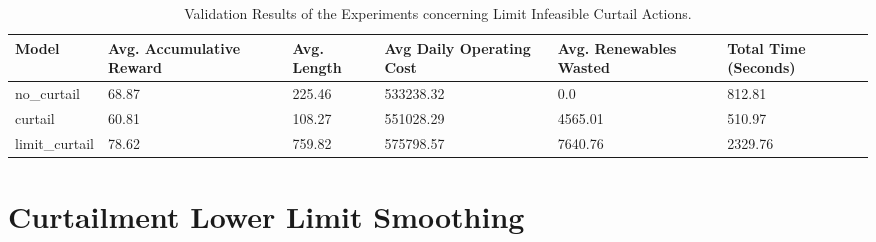 \begin{table}[ht]
	\centering
	\begin{tabularx}{\textwidth}{|l|X|X|X|X|X|}
		\hline
		\textbf{Model} & \textbf{Avg. Accumulative Reward }& \textbf{Avg. Length} & \textbf{Avg Daily Operating Cost} & \textbf{Avg. Renewables Wasted} & \textbf{Total Time (Seconds)}\\
		\hline
		no\_curtail & 68.87 & 225.46 & 533238.32 & 0.0 & 812.81\\
		curtail & 60.81 & 108.27 & 551028.29 & 4565.01 & 510.97 \\
		limit\_curtail & 78.62 & 759.82 & 575798.57 & 7640.76 & 2329.76 \\
		\hline
	\end{tabularx}
	\caption{Validation Results of the Experiments concerning Limit Infeasible Curtail Actions.}
	\label{fig:curtail-val}
\end{table}

\section{Curtailment Lower Limit Smoothing}

